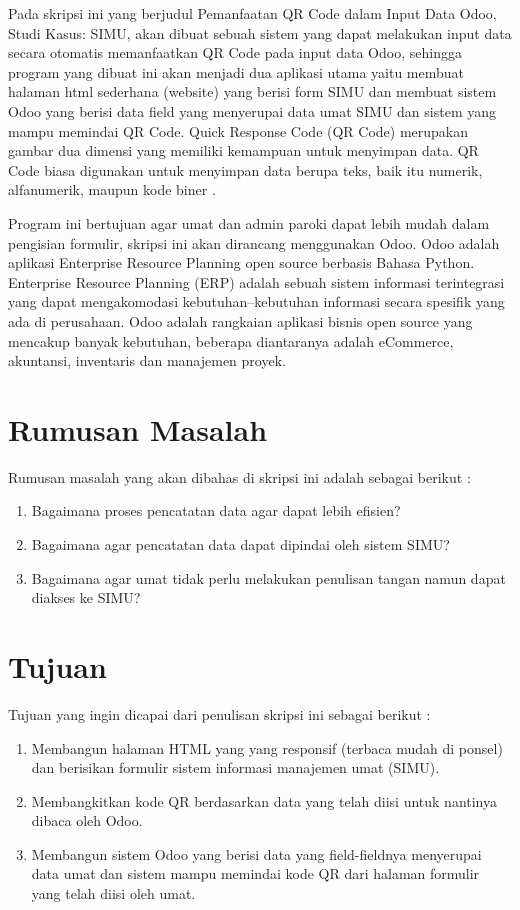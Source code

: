Pada skripsi ini yang berjudul Pemanfaatan QR Code dalam Input Data Odoo, Studi Kasus: SIMU, akan dibuat sebuah sistem yang dapat melakukan input data secara otomatis memanfaatkan QR Code pada input data Odoo, sehingga program yang dibuat ini akan menjadi dua aplikasi utama yaitu membuat halaman html sederhana (website) yang berisi form SIMU dan membuat sistem Odoo yang berisi data field yang menyerupai data umat SIMU dan sistem yang mampu memindai QR Code. Quick Response Code (QR Code) merupakan gambar dua dimensi yang memiliki kemampuan untuk menyimpan data. QR Code biasa digunakan untuk menyimpan data berupa teks, baik itu numerik, alfanumerik, maupun kode biner \cite{qrcode:13:median}.

Program ini bertujuan agar umat dan admin paroki dapat lebih mudah dalam pengisian formulir, skripsi ini akan dirancang menggunakan Odoo. Odoo adalah aplikasi Enterprise Resource Planning open source berbasis Bahasa Python. Enterprise Resource Planning (ERP) adalah sebuah sistem informasi terintegrasi yang dapat mengakomodasi kebutuhan–kebutuhan informasi secara spesifik yang ada di perusahaan. Odoo adalah rangkaian aplikasi bisnis open source yang mencakup banyak kebutuhan, beberapa diantaranya adalah eCommerce, akuntansi, inventaris dan manajemen proyek.

\section{Rumusan Masalah}
\label{sec:rumusan}
Rumusan masalah yang akan dibahas di skripsi ini adalah sebagai berikut :
\begin{enumerate}
	\item Bagaimana proses pencatatan data agar dapat lebih efisien?
	\item Bagaimana agar pencatatan data dapat dipindai oleh sistem SIMU?
	\item Bagaimana agar umat tidak perlu melakukan penulisan tangan namun dapat diakses ke SIMU?
\end{enumerate} 


\section{Tujuan}
\label{sec:tujuan}
Tujuan yang ingin dicapai dari penulisan skripsi ini sebagai berikut :
\begin{enumerate}
	\item Membangun halaman HTML yang yang responsif (terbaca mudah di ponsel) dan berisikan formulir sistem informasi manajemen umat (SIMU).
	\item Membangkitkan kode QR berdasarkan data yang telah diisi untuk nantinya dibaca oleh Odoo.
	\item Membangun sistem Odoo yang berisi data yang field-fieldnya menyerupai data umat dan sistem mampu memindai kode QR dari halaman formulir yang telah diisi oleh umat.
\end{enumerate}


